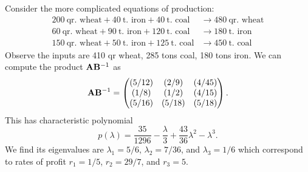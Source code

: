 \begin{example}
  Consider the more complicated equations of production:
  \begin{subequations}
    \begin{align}
      200~\mbox{qr. wheat} + 40~\mbox{t. iron} + 40~\mbox{t. coal} &\to 480~\mbox{qr. wheat}\\
      60~\mbox{qr. wheat} + 90~\mbox{t. iron} + 120~\mbox{t. coal} &\to 180~\mbox{t. iron}\\
      150~\mbox{qr. wheat} + 50~\mbox{t. iron} + 125~\mbox{t. coal} &\to 450~\mbox{t. coal}
    \end{align}
  \end{subequations}
  Observe the inputs are 410 qr wheat, 285 tons coal, 180 tons iron. We
  can compute the product $\mathbf{A}\mathbf{B}^{-1}$ as
  \begin{equation}
\mathbf{A}\mathbf{B}^{-1} = \begin{pmatrix}
  (5/12) & (2/9) & (4/45)\\
  (1/8) & (1/2) & (4/15)\\
  (5/16) & (5/18) & (5/18)
\end{pmatrix}.
  \end{equation}
  This has characteristic polynomial
\begin{equation}
p(\lambda) = \frac{35}{1296} - \frac{\lambda}{3} + \frac{43}{36}\lambda^{2}-\lambda^{3}.
\end{equation}
  We find its eigenvalues are $\lambda_{1}=5/6$, $\lambda_{2}=7/36$, and
  $\lambda_{3}=1/6$ which correspond to rates of profit $r_{1}=1/5$,
  $r_{2}=29/7$, and $r_{3}=5$.%


\end{example}
